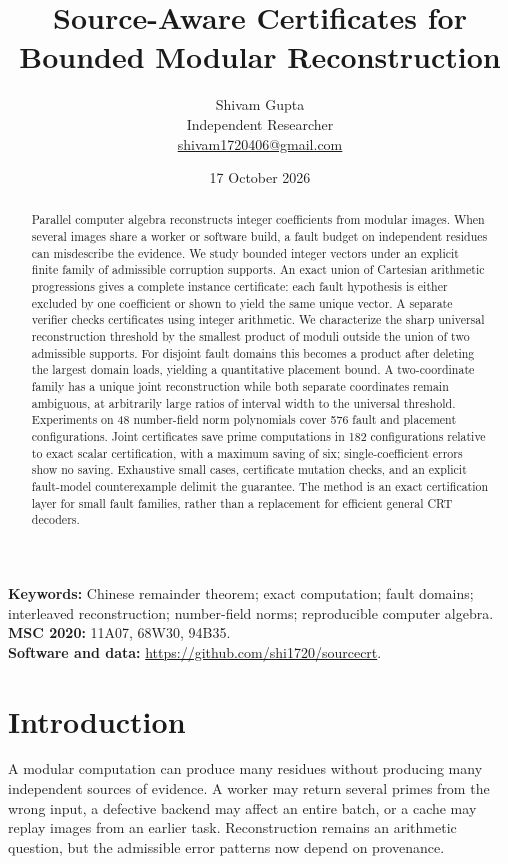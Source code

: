 \documentclass[11pt]{article}
\title{Source-Aware Certificates for\protect\\ Bounded Modular Reconstruction}
\author{Shivam Gupta\\\small Independent Researcher\\\small\href{mailto:shivam1720406@gmail.com}{shivam1720406@gmail.com}}
\date{17 October 2026}
\theoremstyle{definition}\newtheorem{definition}[theorem]{Definition}
\begin{document}
\maketitle
\begin{abstract}
Parallel computer algebra reconstructs integer coefficients from modular images. When several images share a worker or software build, a fault budget on independent residues can misdescribe the evidence. We study bounded integer vectors under an explicit finite family of admissible corruption supports. An exact union of Cartesian arithmetic progressions gives a complete instance certificate: each fault hypothesis is either excluded by one coefficient or shown to yield the same unique vector. A separate verifier checks certificates using integer arithmetic. We characterize the sharp universal reconstruction threshold by the smallest product of moduli outside the union of two admissible supports. For disjoint fault domains this becomes a product after deleting the largest domain loads, yielding a quantitative placement bound. A two-coordinate family has a unique joint reconstruction while both separate coordinates remain ambiguous, at arbitrarily large ratios of interval width to the universal threshold. Experiments on 48 number-field norm polynomials cover 576 fault and placement configurations. Joint certificates save prime computations in 182 configurations relative to exact scalar certification, with a maximum saving of six; single-coefficient errors show no saving. Exhaustive small cases, certificate mutation checks, and an explicit fault-model counterexample delimit the guarantee. The method is an exact certification layer for small fault families, rather than a replacement for efficient general CRT decoders.
\end{abstract}
\noindent\textbf{Keywords:} Chinese remainder theorem; exact computation; fault domains; interleaved reconstruction; number-field norms; reproducible computer algebra.\\
\textbf{MSC 2020:} 11A07, 68W30, 94B35.\\
\textbf{Software and data:} \url{https://github.com/shi1720/sourcecrt}.

\section{Introduction}
A modular computation can produce many residues without producing many independent sources of evidence. A worker may return several primes from the wrong input, a defective backend may affect an entire batch, or a cache may replay images from an earlier task. Reconstruction remains an arithmetic question, but the admissible error patterns now depend on provenance.
\end{document}
